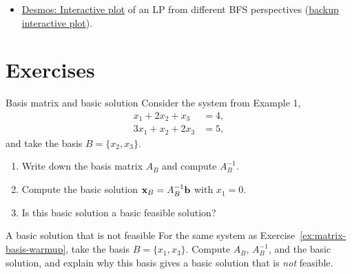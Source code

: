 \begin{resource}
\begin{itemize}
\item \href{https://www.desmos.com/calculator/j1li4l7lcv}{Desmos: Interactive plot} of an LP from different BFS perspectives (\href{https://open-optimization.github.io/open-optimization-or-book/interactive-figures/lp-graphical-method.html}{backup interactive plot}).
\end{itemize}
\end{resource}

\section{Exercises}


\begin{ex}{Basis matrix and basic solution}{}
\label{ex:matrix-basis-warmup}
 Consider the system from Example 1,
\[
\begin{aligned}
    x_1 + 2x_2 + x_3 &= 4, \\
    3x_1 + x_2 + 2x_3 &= 5,
\end{aligned}
\]
and take the basis \( B = \{x_2, x_3\} \).
\begin{enumerate}
    \item Write down the basis matrix \( A_B \) and compute \( A_B^{-1} \).
    \item Compute the basic solution \( \mathbf{x}_B = A_B^{-1}\mathbf{b} \) with \( x_1 = 0 \).
    \item Is this basic solution a basic feasible solution?
\end{enumerate}
\end{ex}

\begin{ex}{A basic solution that is not feasible}{}
\label{ex:matrix-infeasible-basis}
 For the same system as Exercise~\ref{ex:matrix-basis-warmup}, take the basis \( B = \{x_1, x_3\} \).  Compute \( A_B \), \( A_B^{-1} \), and the basic solution, and explain why this basis gives a basic solution that is \emph{not} feasible.
\end{ex}

